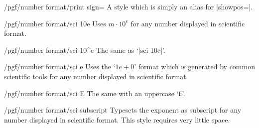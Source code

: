 \begin{stylekey}{/pgf/number format/print sign=}
    A style which is simply an alias for |showpos=|.
\end{stylekey}

\begin{key}{/pgf/number format/sci 10e}
    Uses $m \cdot 10^e$ for any number displayed in scientific format.
\begin{codeexample}[pre={\begin{lateximage}},post={\end{lateximage}}]
\end{codeexample}
\end{key}

\begin{key}{/pgf/number format/sci 10\textasciicircum e}
    The same as `|sci 10e|'.
\end{key}

\begin{key}{/pgf/number format/sci e}
    Uses the `$1e{+}0$' format which is generated by common scientific tools
    for any number displayed in scientific format.
\begin{codeexample}[pre={\begin{lateximage}},post={\end{lateximage}}]
\end{codeexample}
\end{key}

\begin{key}{/pgf/number format/sci E}
    The same with an uppercase `\texttt{E}'.
\begin{codeexample}[pre={\begin{lateximage}},post={\end{lateximage}}]
\end{codeexample}
\end{key}

\begin{key}{/pgf/number format/sci subscript}
    Typesets the exponent as subscript for any number displayed in scientific
    format. This style requires very little space.
\begin{codeexample}[pre={\begin{lateximage}},post={\end{lateximage}}]
\end{codeexample}
\end{key}

